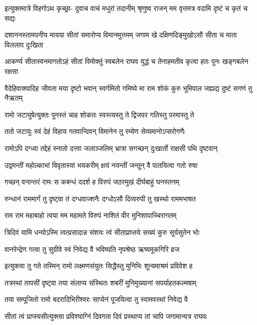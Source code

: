 \fourlineindentedshloka
{इत्युक्तमात्रे विहगोऽथ कृच्छ्रा-}
{दुवाच वाचं मधुरां तदानीम्}
{श्रृणुष्व राजन् मम वृत्तमत्र}
{वदामि दृष्टं च कृतं च सद्यः} %

\fourlineindentedshloka
{दशाननस्तामपनीय मायया}
{सीतां समारोप्य विमानमुत्तमम्}
{जगाम खे दक्षिणदिङ्मुखोऽसौ}
{सीता च माता विललाप दुःखिता} %

\fourlineindentedshloka
{आकर्ण्य सीतास्वनमागतोऽहं}
{सीतां विमोक्तुं स्वबलेन राघव}
{युद्धं च तेनाहमतीव कृत्वा}
{हतः पुनः खङ्गबलेन रक्षसा} %

\fourlineindentedshloka
{वैदेहिवाक्यादिह जीवता मया}
{दृष्टो भवान् स्वर्गमितो गमिष्ये}
{मा राम शोकं कुरु भूमिपाल}
{जह्यद्य दुष्टं सगणं तु नैऋतम्} %

\twolineshloka
{रामो जटायुषेत्युक्तः पुनस्तं चाह शोकतः}
{स्वस्त्यस्तु ते द्विजवर गतिस्तु परमास्तु ते} %

\twolineshloka
{ततो जटायुः स्वं देहं विहाय गतवान्दिवन्}
{विमानेन तु रम्येण सेव्यमानोऽप्सरोगणैः} %

\twolineshloka
{रामोऽपि दग्ध्वा तद्देहं स्नातो दत्त्वा जलाञ्जलिम्}
{भ्रात्रा सगच्छन् दुःखार्तो राक्षसी पथि दृष्टवान्} %

\twolineshloka
{उद्वमन्तीं महोल्काभां विवृतास्यां भयकरीम्}
{क्षयं नयन्तीं जन्तून् वै पातयित्वा गतो रुषा} %

\twolineshloka
{गच्छन् वनान्तरं रामः स कबन्धं ददर्श ह}
{विरुपं जठरमुखं दीर्घबाहुं घनस्तनम्} %

\twolineshloka
{रुन्धानं राममार्गं तु दृष्ट्वा तं दग्धवाज्शनैः}
{दग्धोऽसौ दिव्यरुपी तु खस्थो राममभाषत} %

\twolineshloka
{राम राम महाबाहो त्वया मम महामते}
{विरुपं नाशितं वीर मुनिशापाच्चिरागतम्} %

\twolineshloka
{त्रिदिवं यामि धन्योऽस्मि त्वत्प्रसादान्न संशयः}
{त्वं सीताप्राप्तये सख्यं कुरु सूर्यसुतेन भोः} %

\twolineshloka
{वानरेन्द्रेण गत्वा तु सुग्रीवे स्वं निवेद्य वै}
{भविष्यति नृपश्रेष्ठ ऋष्यमूकगिरि व्रज} %

\twolineshloka
{इत्युक्त्वा तु गते तस्मिन् रामो लक्ष्मणसंयुतः}
{सिद्धैस्तु मुनिभिः शून्यमाश्रमं प्रविवेश ह} %

\twolineshloka
{तत्रस्थां तापसीं दृष्ट्वा तया संलाप्य संस्थितः}
{शबरीं मुनिमुख्यानां सपर्याहतकल्मषाम्} %

\twolineshloka
{तया सम्पूजितो रामो बदरादिभिरीश्वरः}
{साप्येनं पूजयित्वा तु स्वामवस्थां निवेद्य वै} %

\twolineshloka
{सीतां त्वं प्राप्स्यसीत्युक्त्वा प्रविश्याग्निं दिवगता}
{दिवं प्रस्थाप्य तां चापि जगामान्यत्र राघवः} %

